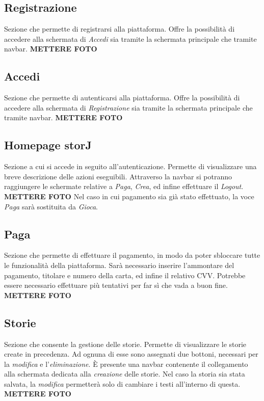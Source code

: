 \documentclass{article}
\begin{document}
\subsection*{Registrazione}
Sezione che permette di registrarsi alla piattaforma. Offre la possibilità di accedere alla schermata di \textit{Accedi} sia tramite la schermata principale che tramite navbar.
\textbf{METTERE FOTO}

\subsection*{Accedi}
Sezione che permette di autenticarsi alla piattaforma. Offre la possibilità di accedere alla schermata di \textit{Registrazione} sia tramite la schermata principale che tramite navbar.
\textbf{METTERE FOTO}

\subsection*{Homepage storJ}
Sezione a cui si accede in seguito all'autenticazione. Permette di visualizzare una breve descrizione delle azioni eseguibili. Attraverso la navbar si potranno raggiungere le schermate relative a \textit{Paga}, \textit{Crea}, ed infine effettuare il \textit{Logout}.
\textbf{METTERE FOTO}
Nel caso in cui pagamento sia già stato effettuato, la voce \textit{Paga} sarà sostituita da \textit{Gioca}.

\subsection*{Paga}
Sezione che permette di effettuare il pagamento, in modo da poter sbloccare tutte le funzionalità della piattaforma. Sarà necessario inserire l'ammontare del pagamento, titolare e numero della carta, ed infine il relativo CVV. Potrebbe essere necessario effettuare più tentativi per far sì che vada a buon fine.
\textbf{METTERE FOTO}

\subsection*{Storie}
Sezione che consente la gestione delle storie. Permette di visualizzare le storie create in precedenza. Ad ognuna di esse sono assegnati due bottoni, necessari per la \textit{modifica} e l'\textit{eliminazione}. È presente una navbar contenente il collegamento alla schermata dedicata alla \textit{creazione} delle storie. Nel caso la storia sia stata salvata, la \textit{modifica} permetterà solo di cambiare i testi all'interno di questa.
\textbf{METTERE FOTO}
\end{document}
